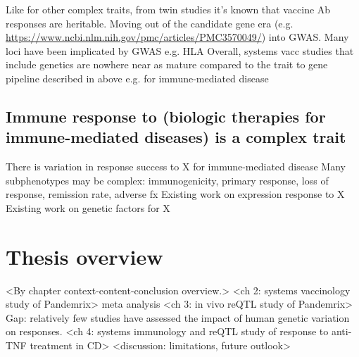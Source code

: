 \begin{outline}
\1 Like for other complex traits, from twin studies it's known that vaccine Ab responses are heritable.
    \2 Moving out of the candidate gene era (e.g. \url{https://www.ncbi.nlm.nih.gov/pmc/articles/PMC3570049/}) into GWAS.
    \2 Many loci have been implicated by GWAS e.g. HLA \autocite{oconnor2013CharacterizingVaccineResponses,mooney2013SystemsImmunogeneticsVaccines,mentzer2015SearchingHumanGenetic,linnik2016ImpactHostGenetic,scepanovic2018HumanGeneticVariants,dhakal2019HostFactorsImpact}
    \2 Overall, systems vacc studies that include genetics are nowhere near as mature compared to the trait to gene pipeline described in above e.g. for immune-mediated disease

    \subsection{Immune response to (biologic therapies for immune-mediated diseases) is a complex trait}

\1 There is variation in response success to X for immune-mediated disease
\1 Many subphenotypes may be complex: immunogenicity, primary response, loss of response, remission rate, adverse fx
\1 Existing work on expression response to X 
\1 Existing work on genetic factors for X 

\section{Thesis overview}

\1 <By chapter context-content-conclusion overview.>
    \2 <ch 2: systems vaccinology study of Pandemrix>
        \3 meta analysis
    \2 <ch 3: in vivo reQTL study of Pandemrix>
        \3 Gap: relatively few studies have assessed the impact of human genetic variation on responses.
    \2 <ch 4: systems immunology and reQTL study of response to anti-TNF treatment in CD>
    \2 <discussion: limitations, future outlook>

\end{outline}

